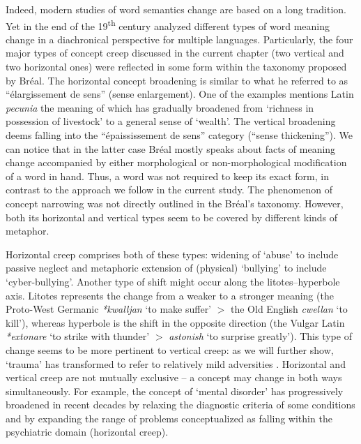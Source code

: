 \documentclass[output=paper]{langsci/langscibook}
\begin{document}
Indeed, modern studies of word semantics change are based on a long tradition. Yet in the end of the 19\textsuperscript{th} century \citet{breal1897essai} analyzed different types of word meaning change in a diachronical perspective for multiple languages. Particularly, the four major types of concept creep discussed in the current chapter (two vertical and two horizontal ones) were reflected in some form within the taxonomy proposed by Br{\'e}al. The horizontal concept broadening is similar to what he referred to as ``élargissement de sens'' (sense enlargement). One of the examples mentions Latin \textit{pecunia} the meaning of which has gradually broadened from `richness in possession of livestock' to a general sense of `wealth'. The vertical broadening deems falling into the ``épaississement de sens'' category (``sense thickening''). We can notice that in the latter case Br{\'e}al mostly speaks about facts of meaning change accompanied by either morphological or non-morphological modification of a word in hand. Thus, a word was not required to keep its exact form, in contrast to the approach we follow in the current study. The phenomenon of concept narrowing was not directly outlined in the Br{\'e}al's taxonomy. However, both its horizontal and vertical types seem to be covered by different kinds of metaphor.

Horizontal creep comprises both of these types: widening of `abuse' to include passive neglect and metaphoric extension of (physical) `bullying' to include `cyber-bullying'.  
Another type of shift might occur along the litotes--hyperbole axis. Litotes represents the change from a weaker to a stronger meaning (the Proto-West Germanic \textit{*kwalljan} `to make suffer' $>$ the Old English \textit{cwellan} `to kill'), whereas hyperbole is the shift in the opposite direction (the Vulgar Latin \textit{*extonare} `to strike with thunder'  $>$  \textit{astonish} `to surprise greatly'). This type of change seems to be more pertinent to vertical creep: as we will further show, `trauma' has transformed to refer to relatively mild adversities \citep{haslam2020concept}.  Horizontal and vertical creep are not mutually exclusive -- a concept may change in both ways simultaneously. For example, the concept of `mental disorder' has progressively broadened in recent decades by relaxing the diagnostic criteria of some conditions  \citep[vertical creep;][]{fabiano2020diagnostic} and by expanding the range of problems conceptualized as falling within the psychiatric domain (horizontal creep).
\end{document}
